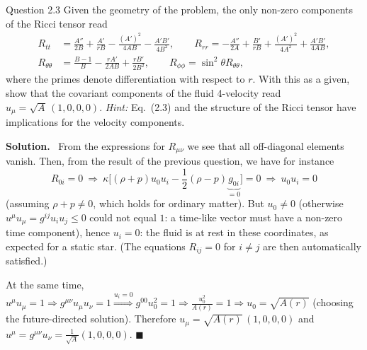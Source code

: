 \documentclass[11pt,a4paper]{article}
\numberwithin{equation}{subsection}
\newenvironment{solution}{\par\noindent\textbf{\textcolor{excol!70!black}{Solution.}}\ }{\hfill$\blacksquare$\par\medskip}
\newcommand{\added}[1]{{\color{teal!60!black}#1}}
\begin{document}
\begin{problem}{Question 2.3}
Given the geometry of the problem, the only non-zero components of the Ricci tensor read
\begin{align*}
  R_{tt}&=\frac{A''}{2B}+\frac{A'}{rB}-\frac{(A')^2}{4AB}-\frac{A'B'}{4B^2},\qquad
  R_{rr}=-\frac{A''}{2A}+\frac{B'}{rB}+\frac{(A')^2}{4A^2}+\frac{A'B'}{4AB},\\
  R_{\theta\theta}&=\frac{B-1}{B}-\frac{rA'}{2AB}+\frac{rB'}{2B^2},\qquad R_{\phi\phi}=\sin^2\theta R_{\theta\theta}, \tag{2.4}
\end{align*}
where the primes denote differentiation with respect to $r$. With this as a given, show that the covariant components of the fluid 4-velocity read $u_\mu=\sqrt A\,(1,0,0,0)$. \emph{Hint:} Eq.~(2.3) and the structure of the Ricci tensor have implications for the velocity components.
\end{problem}
\begin{solution}
From the expressions for $R_{\mu\nu}$ we see that all off-diagonal elements vanish. Then, from the result of the previous question, we have for instance
\[
  R_{0i}=0\ \Rightarrow\ \kappa\Big[(\rho+p)u_0u_i-\frac12(\rho-p)\underbrace{g_{0i}}_{=0}\Big]=0\ \Rightarrow\ u_0u_i=0
\]
(assuming $\rho+p\neq0$, which holds for ordinary matter). But $u_0\neq0$ (otherwise $u^\mu u_\mu=g^{ij}u_iu_j\le0$ could not equal $1$: a time-like vector must have a non-zero time component), hence $u_i=0$: the fluid is at rest in these coordinates, as expected for a static star. \added{(The equations $R_{ij}=0$ for $i\neq j$ are then automatically satisfied.)}

At the same time, $u^\mu u_\mu=1\Rightarrow g^{\mu\nu}u_\mu u_\nu=1\overset{u_i=0}{\Longrightarrow}g^{00}u_0^2=1\Rightarrow\frac{u_0^2}{A(r)}=1\Rightarrow u_0=\sqrt{A(r)}$ (choosing the future-directed solution). Therefore $u_\mu=\sqrt{A(r)}\,(1,0,0,0)$ \added{and $u^\mu=g^{\mu\nu}u_\nu=\frac{1}{\sqrt{A}}(1,0,0,0)$}.
\end{solution}
\end{document}
